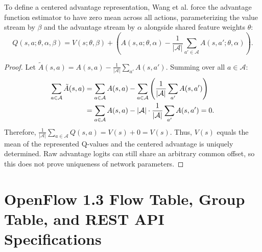 \documentclass[12pt,a4paper,oneside]{report}
\let\cite\citep
\begin{document}
To define a centered advantage representation, Wang et al. \cite{wang2016dueling} force the advantage function estimator to have zero mean across all actions, parameterizing the value stream by $\beta$ and the advantage stream by $\alpha$ alongside shared feature weights $\theta$:
\begin{equation}
Q(s, a; \theta, \alpha, \beta) = V(s; \theta, \beta) + \left( A(s, a; \theta, \alpha) - \frac{1}{|\mathcal{A}|} \sum_{a' \in \mathcal{A}} A(s, a'; \theta, \alpha) \right).
\end{equation}
\begin{proof}
Let $\tilde{A}(s, a) = A(s, a) - \frac{1}{|\mathcal{A}|} \sum_{a'} A(s, a')$. Summing over all $a \in \mathcal{A}$:
\begin{align}
\sum_{a \in \mathcal{A}} \tilde{A}(s, a) &= \sum_{a \in \mathcal{A}} A(s, a) - \sum_{a \in \mathcal{A}} \left( \frac{1}{|\mathcal{A}|} \sum_{a'} A(s, a') \right) \notag \\
&= \sum_{a \in \mathcal{A}} A(s, a) - |\mathcal{A}| \cdot \frac{1}{|\mathcal{A}|} \sum_{a'} A(s, a') = 0.
\end{align}
Therefore, $\frac{1}{|\mathcal{A}|} \sum_{a \in \mathcal{A}} Q(s, a) = V(s) + 0 = V(s)$. Thus, $V(s)$ equals the mean of the represented Q-values and the centered advantage is uniquely determined. Raw advantage logits can still share an arbitrary common offset, so this does not prove uniqueness of network parameters.
\end{proof}

\chapter{OpenFlow 1.3 Flow Table, Group Table, and REST API Specifications}
\label{app:openflow_api}
\end{document}

